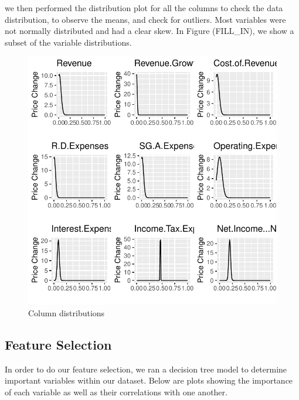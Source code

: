 \documentclass[11pt,]{article}
\begin{document}
we then performed the distribution plot for all the columns to check the
data distribution, to observe the means, and check for outliers. Most
variables were not normally distributed and had a clear skew. In Figure
(FILL\_IN), we show a subset of the variable distributions.

\begin{figure}

{\centering \includegraphics{stock_analysis_files/figure-latex/data normal distribution plot1-1} 

}

\caption{Column distributions}\label{fig:data normal distribution plot1}
\end{figure}

\hypertarget{feature-selection-1}{%
\subsection{Feature Selection}\label{feature-selection-1}}

In order to do our feature selection, we ran a decision tree model to
determine important variables within our dataset. Below are plots
showing the importance of each variable as well as their correlations
with one another.
\end{document}
